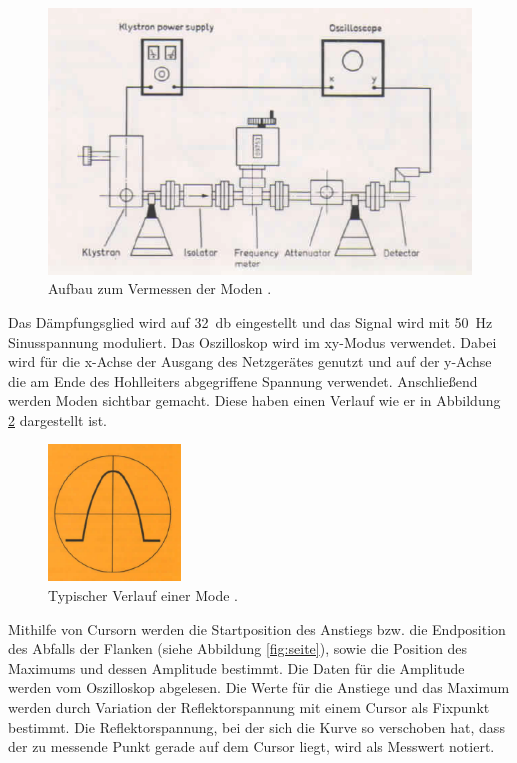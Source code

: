 \begin{figure}
  \centering
  \includegraphics[width=\textwidth]{data/aufbau_mode.png}
  \caption{Aufbau zum Vermessen der Moden \cite{Versuchsanleitung_alt}.}
  \label{fig:aufbau_mode}
\end{figure}

Das Dämpfungsglied wird auf \SI{32}{\decibel} eingestellt und das Signal
wird mit \SI{50}{\hertz} Sinusspannung moduliert. Das Oszilloskop
wird im xy-Modus verwendet. Dabei wird für die x-Achse der Ausgang des Netzgerätes
genutzt und auf der y-Achse die am Ende des Hohlleiters abgegriffene Spannung
verwendet. Anschließend werden Moden sichtbar gemacht. Diese haben einen
Verlauf wie er in Abbildung \ref{fig:mode} dargestellt ist.

\begin{figure}
  \centering
  \includegraphics[width=100pt]{data/mode.png}
  \caption{Typischer Verlauf einer Mode \cite{Versuchsanleitung_alt}.}
  \label{fig:mode}
\end{figure}

Mithilfe von Cursorn werden die Startposition des Anstiegs bzw. die Endposition
des Abfalls der Flanken (siehe Abbildung \ref{fig:seite}), sowie die Position des
Maximums und dessen Amplitude bestimmt. Die Daten für die Amplitude werden vom
Oszilloskop abgelesen. Die Werte für die Anstiege und das Maximum werden durch
Variation der Reflektorspannung mit einem Cursor als Fixpunkt bestimmt. Die Reflektorspannung,
bei der sich die Kurve so verschoben hat, dass der zu messende Punkt gerade auf dem
Cursor liegt, wird als Messwert notiert.

